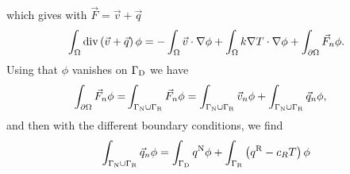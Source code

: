 %
which gives with $\vec{F}=\vec{v} + \vec{q}$%
\begin{align*}
\int_{\Omega} \operatorname{div}\left(\vec{v} + \vec{q}\right)\phi = -\int_{\Omega}\vec{v}\cdot\nabla\phi
+ \int_{\Omega}k\nabla T\cdot\nabla\phi+ \int_{\partial\Omega} \vec{F}_n\phi.
\end{align*}
%
Using that $\phi$ vanishes on $\Gamma_{\rm D}$ we have
%
\begin{align*}
\int_{\partial\Omega} \vec{F}_n\phi =& \int_{\Gamma_{\rm N}\cup\Gamma_{\rm R}} \vec{F}_n\phi
= \int_{\Gamma_{\rm N}\cup\Gamma_{\rm R}} \vec{v}_n\phi + \int_{\Gamma_{\rm N}\cup\Gamma_{\rm R}} \vec{q}_n\phi,
\end{align*}
%
and then with the different boundary conditions, we find
%
\begin{align*}
\int_{\Gamma_{\rm N}\cup\Gamma_{\rm R}} \vec{q}_n\phi = \int_{\Gamma_{\rm D}} q^{\rm N}\phi + \int_{\Gamma_{\rm R}}\left(q^{\rm R} - c_R T\right)\phi
\end{align*}
%




\printbibliography[title=References Section~\thesection]



